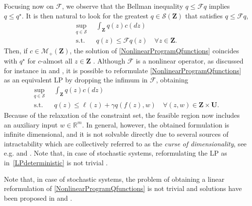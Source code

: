 \documentclass[journal,twoside,web]{ieeecolor}
\newcommand{\F}{\mathcal{F}}
\newcommand{\Zb}{\mathbf{Z}}
\newcommand{\review}{\color{black}}
\begin{document}
Focusing now on $\F$, we observe that the Bellman inequality $q \le \F q$ implies $q \le q^{\star}$. It is then natural to look for the greatest $q \in \mathcal{S}(\Zb)$ that satisfies $q \le \F q$,
%
\begin{equation}\label{NonlinearProgramQfunctions}
	\begin{aligned}
		\sup_{q\in\mathcal{S}} \;\; & \int_{\Zb} q(z)c(dz) \\
		\mbox{s.t.} \;\; & q(z) \le \mathcal{F}q(z) \quad \forall z \in \Zb.
	\end{aligned}
\end{equation}
%
Then, if $c\in\mathcal{M}_+(\Zb)$, the solution of \eqref{NonlinearProgramQfunctions} coincides with $q^\star$ for $c$-almost all $z \in \Zb$ \cite{LasserreDTMCP,GoranADP}. Although $\F$ is a nonlinear operator, as discussed for instance in \cite{PaulADP} and \cite{GoranADP}, it is possible to reformulate \eqref{NonlinearProgramQfunctions} as an equivalent LP by dropping the infimum in $\F$, obtaining
%
\begin{equation}\label{LPdeterministic}
	\begin{aligned}
		\sup_{q\in \mathcal{S}} \;\; & \int_{\Zb} q(z)c(dz) \\
		\mbox{s.t.} \;\; & q(z) \le \ell(z) + \gamma q(f(z),w) \quad \forall(z,w) \in \Zb\times\mathbf{U}.
	\end{aligned}
\end{equation}
%
Because of the relaxation of the constraint set, the feasible region now includes an auxiliary input $w\in\mathbb{R}^m$. In general, however, the obtained formulation is infinite dimensional, and it is not solvable directly due to several sources of intractability which are collectively referred to as the \textit{curse of dimensionality}, see e.g. \cite{PaulADP} and \cite{WangIteratedBellInequalities}. {\review Note that, in case of stochastic systems, reformulating the LP as in~\eqref{LPdeterministic} is not trivial \cite{CogillDecentralizedADP, RelaxedBellmanOp}.} 

\iffalse
{} Note that, in case of stochastic systems, the problem of obtaining a linear reformulation of \eqref{NonlinearProgramQfunctions} is not trivial and solutions have been proposed in \cite{CogillDecentralizedADP} and \cite{RelaxedBellmanOp}.
\end{document}
